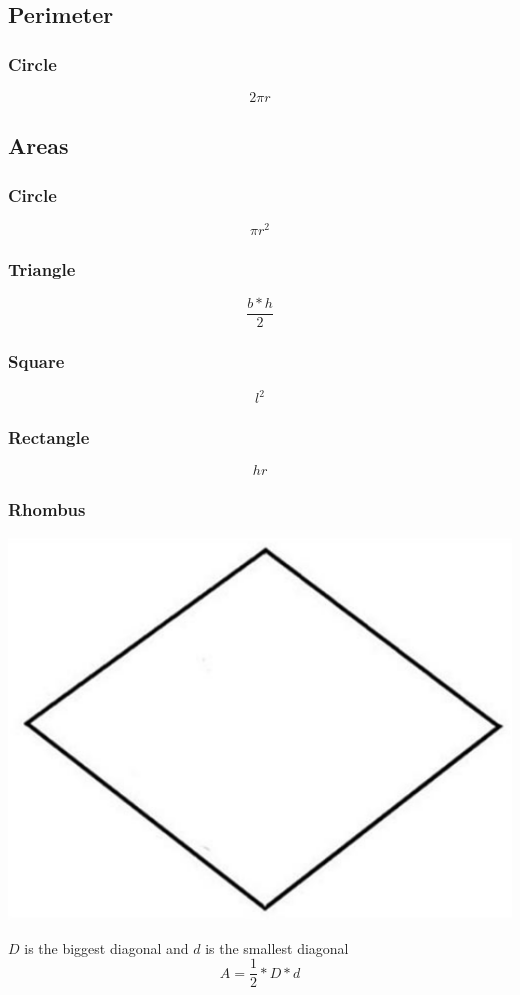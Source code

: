 \subsection{Perimeter}
\subsubsection{Circle}
$$ 2 \pi r $$

\subsection{Areas}
\subsubsection{Circle}
$$ \pi r^2 $$
\subsubsection{Triangle}
$$ \dfrac{b * h}{2} $$
\subsubsection{Square}
$$ l^2 $$
\subsubsection{Rectangle}
$$ hr $$
\subsubsection{Rhombus}
\begin{center}
    \includegraphics[scale=.2, keepaspectratio]{./Theory/images/rhombus.png}
\end{center}
$D$ is the biggest diagonal and $d$ is the smallest diagonal
$$ A = \dfrac{1}{2} * D * d $$
